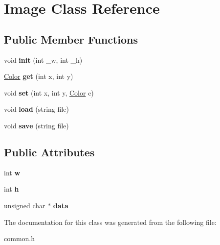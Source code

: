 \hypertarget{class_image}{}\section{Image Class Reference}
\label{class_image}
\subsection*{Public Member Functions}
\begin{DoxyCompactItemize}
\item 
\hypertarget{class_image_a1fb2324ff48ef5856e728d2440fd1737}{}void {\bfseries init} (int \+\_\+w, int \+\_\+h)\label{class_image_a1fb2324ff48ef5856e728d2440fd1737}

\item 
\hypertarget{class_image_a6bdfdc0f490176f6c8fc6ac234d1cb76}{}\hyperlink{class_color}{Color} {\bfseries get} (int x, int y)\label{class_image_a6bdfdc0f490176f6c8fc6ac234d1cb76}

\item 
\hypertarget{class_image_add8aa0a39b391769d990f1e41bdfa064}{}void {\bfseries set} (int x, int y, \hyperlink{class_color}{Color} c)\label{class_image_add8aa0a39b391769d990f1e41bdfa064}

\item 
\hypertarget{class_image_a25c684b846a4fe4844d90a0da6dc502e}{}void {\bfseries load} (string file)\label{class_image_a25c684b846a4fe4844d90a0da6dc502e}

\item 
\hypertarget{class_image_af94ae66cb361c96ab3b554ebe288aa04}{}void {\bfseries save} (string file)\label{class_image_af94ae66cb361c96ab3b554ebe288aa04}

\end{DoxyCompactItemize}
\subsection*{Public Attributes}
\begin{DoxyCompactItemize}
\item 
\hypertarget{class_image_a5a1c5528c889b0438bc2dc0c0ee94dbe}{}int {\bfseries w}\label{class_image_a5a1c5528c889b0438bc2dc0c0ee94dbe}

\item 
\hypertarget{class_image_aead13dbc461159381773fff06824e651}{}int {\bfseries h}\label{class_image_aead13dbc461159381773fff06824e651}

\item 
\hypertarget{class_image_a22b726c8306f78b5022e0670ddb0937f}{}unsigned char $\ast$ {\bfseries data}\label{class_image_a22b726c8306f78b5022e0670ddb0937f}

\end{DoxyCompactItemize}


The documentation for this class was generated from the following file\+:\begin{DoxyCompactItemize}
\item 
common.\+h\end{DoxyCompactItemize}
